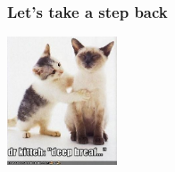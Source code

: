 \begin{frame}[fragile]
\frametitle{Let's take a step back}
\begin{center}
\end{center}
\begin{center}
\includegraphics[height=3.8cm]{image/deep-breaf.jpg}
\end{center}
\end{frame}
